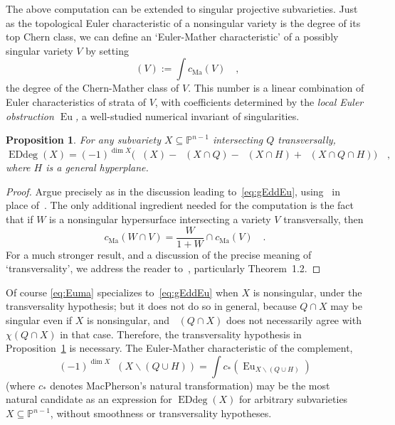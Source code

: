 \documentclass[11pt]{amsart}
\newtheorem{prop}[theorem]{Proposition}
\numberwithin{equation}{section}
\newcommand{\Pbb}{{\mathbb{P}}}
\newcommand{\cma}{{c_{\text{Ma}}}}
\DeclareMathOperator{\Eu}{Eu}
\DeclareMathOperator{\Edd}{EDdeg}
\DeclareMathOperator{\chima}{\chi_\text{Ma}}
\begin{document}
The above computation can be extended to singular projective subvarieties. 
Just as the topological Euler characteristic of a nonsingular variety is the degree of its 
top Chern class, we can define an `Euler-Mather characteristic' of a possibly singular 
variety $V$ by setting
\[
\chima(V):= \int \cma(V)\quad,
\]
the degree of the Chern-Mather class of $V$.
This number is a linear combination of Euler characteristics of strata of $V$, with coefficients
determined by the {\em local Euler obstruction $\Eu$,\/} a well-studied numerical invariant of
singularities.

\begin{prop}\label{prop:gEddsin}
For {\em any\/} subvariety $X\subseteq\Pbb^{n-1}$ intersecting $Q$ transversally,
\begin{equation}\label{eq:Euma}
\Edd(X) = (-1)^{\dim X}\big(\chima(X) - \chima(X\cap Q) -\chima(X\cap H) 
+ \chima(X\cap Q\cap H)\big)\quad,
\end{equation}
where $H$ is a general hyperplane.
\end{prop}

\begin{proof}
Argue precisely as in the discussion leading to~\eqref{eq:gEddEu}, 
using~\cite[Proposition 2.9]{produa} in place of~\cite[Theorem~5.8]{MR3451425}. 
The only additional ingredient needed for the computation is the fact that if $W$ is a 
nonsingular hypersurface intersecting a variety $V$ transversally, then
\[
\cma(W\cap V) = \frac{W}{1+W}\cap \cma(V)\quad.
\]
For a much stronger result, and a discussion of the precise meaning of `transversality',
we address the reader to~\cite{schurmann:transversality}, particularly Theorem~1.2.
\end{proof}

Of course \eqref{eq:Euma} specializes to~\eqref{eq:gEddEu} when $X$ is nonsingular,
under the transversality hypothesis; but it does not do so in general, because $Q\cap X$  
may be singular even if $X$ is nonsingular, and $\chima(Q\cap X)$ does not necessarily 
agree with $\chi(Q\cap X)$ in that case. 
Therefore, the transversality hypothesis in Proposition~\ref{prop:gEddsin}
is necessary. The Euler-Mather characteristic of the complement,
\[
(-1)^{\dim X} \chima(X\smallsetminus (Q\cup H)) = \int c_*(\Eu_{X\smallsetminus
(Q\cup H)})
\]
(where $c_*$ denotes MacPherson's natural transformation)
may be the most natural candidate as an expression for $\Edd(X)$ for arbitrary
subvarieties $X\subseteq \Pbb^{n-1}$, without smoothness or transversality
hypotheses.
\end{document}
